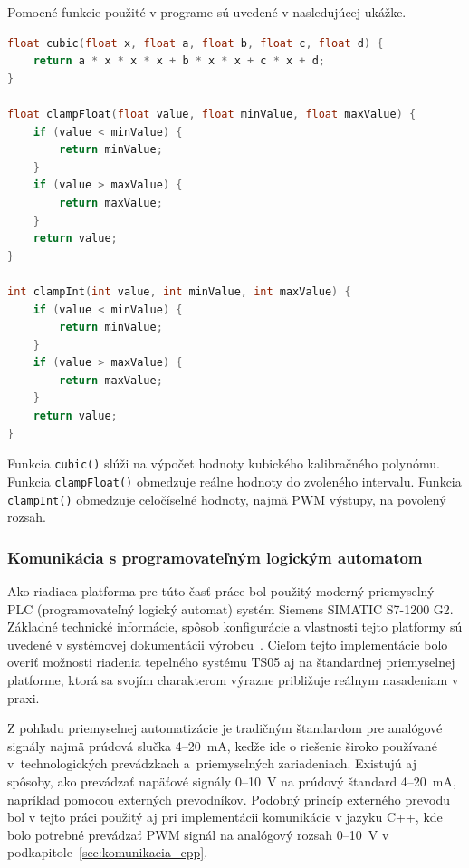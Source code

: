 Pomocné funkcie použité v programe sú uvedené v nasledujúcej ukážke.

\begin{lstlisting}[language=C++, caption={Pomocné funkcie použité v programe}, label={lst:helper_functions_cpp}]
float cubic(float x, float a, float b, float c, float d) {
    return a * x * x * x + b * x * x + c * x + d;
}

float clampFloat(float value, float minValue, float maxValue) {
    if (value < minValue) {
        return minValue;
    }
    if (value > maxValue) {
        return maxValue;
    }
    return value;
}

int clampInt(int value, int minValue, int maxValue) {
    if (value < minValue) {
        return minValue;
    }
    if (value > maxValue) {
        return maxValue;
    }
    return value;
}
\end{lstlisting}

Funkcia \texttt{cubic()} slúži na výpočet hodnoty kubického kalibračného polynómu.
Funkcia \texttt{clampFloat()} obmedzuje reálne hodnoty do zvoleného intervalu.
Funkcia \texttt{clampInt()} obmedzuje celočíselné hodnoty, najmä PWM výstupy,
na povolený rozsah.


\subsubsection{Komunikácia s programovateľným logickým automatom}
\label{sec:komunikacia_siemens}

Ako riadiaca platforma pre túto časť práce bol použitý moderný priemyselný
PLC (programovateľný logický automat) systém Siemens SIMATIC S7-1200 G2. Základné technické informácie,
spôsob konfigurácie a vlastnosti tejto platformy sú uvedené v systémovej
dokumentácii výrobcu~\cite{siemens_s71200g2_manual}. Cieľom tejto implementácie
bolo overiť možnosti riadenia tepelného systému TS05 aj na štandardnej
priemyselnej platforme, ktorá sa svojím charakterom výrazne približuje reálnym
nasadeniam v praxi.

Z pohľadu priemyselnej automatizácie je tradičným štandardom pre analógové
signály najmä prúdová slučka \mbox{4--20~mA}, keďže ide o riešenie široko
používané v~technologických prevádzkach a~priemyselných zariadeniach.
Existujú aj spôsoby, ako prevádzať napäťové signály \mbox{0--10~V} na prúdový
štandard \mbox{4--20~mA}, napríklad pomocou externých prevodníkov. Podobný
princíp externého prevodu bol v tejto práci použitý aj pri implementácii
komunikácie v jazyku C++, kde bolo potrebné prevádzať PWM signál na analógový
rozsah \mbox{0--10~V} v podkapitole~\ref{sec:komunikacia_cpp}.

